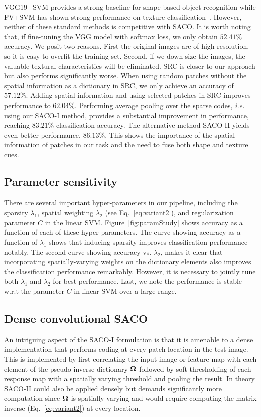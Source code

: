 \documentclass[10pt,twocolumn,letterpaper]{article}
\def\ie{\emph{i.e. }}
\begin{document}
VGG19+SVM provides a strong baseline for shape-based object recognition while
FV+SVM has shown strong performance on texture
classification~\cite{cimpoi2015deep}.
However, neither of these standard methods is competitive with SACO.
It is worth noting that, if fine-tuning the VGG model with softmax loss,
we only obtain $52.41\%$ accuracy. We posit two reasons.
First the original images are of high resolution, so it is easy to overfit the training set.
Second, if we down size the images, the valuable textural characteristics will be eliminated.
SRC is closer to our approach but also performs significantly worse.  When using
random patches without the spatial information as a dictionary in SRC, we only
achieve an accuracy of $57.12\%$.  Adding spatial information and using
selected patches in SRC improves performance to $62.04\%$.  Performing average
pooling over the sparse codes, \ie using our SACO-I method, provides a
substantial improvement in performance, reaching $83.21\%$ classification
accuracy.  The alternative method SACO-II yields even better performance,
$86.13\%$.  This shows the importance of the spatial information of patches in
our task and the need to fuse both shape and texture cues.


\subsection{Parameter sensitivity}
\label{ssec:paramStudy}

There are several important hyper-parameters in our pipeline, including the
sparsity $\lambda_1$, spatial weighting $\lambda_2$ (see
Eq.~\ref{eq:variant2}), and regularization parameter $C$ in the linear SVM.
Figure~\ref{fig:paramStudy} shows accuracy as a function of each of these
hyper-parameters.  The curve showing accuracy as a function of $\lambda_1$
shows that inducing sparsity improves classification performance notably.  The
second curve showing accuracy vs. $\lambda_2$, makes it clear that
incorporating spatially-varying weights on the dictionary elements also
improves the classification performance remarkably.  However, it is necessary
to jointly tune both $\lambda_1$ and $\lambda_2$ for best performance.  Last,
we note the performance is stable w.r.t the parameter $C$ in linear SVM over a
large range.

\subsection{Dense convolutional SACO}
An intriguing aspect of the SACO-I formulation is that it is amenable to a
dense implementation that performs coding at every patch location in the test
image.  This is implemented by first correlating the input image or feature map
with each element of the pseudo-inverse dictionary ${\bf \Omega}$ followed by
soft-thresholding of each response map with a spatially varying threshold and
pooling the result. In theory SACO-II could also be applied densely but demands
significantly more computation since ${\bf \Omega}$ is spatially varying and would
require computing the matrix inverse (Eq.~\ref{eq:variant2}) at every location.
\end{document}
